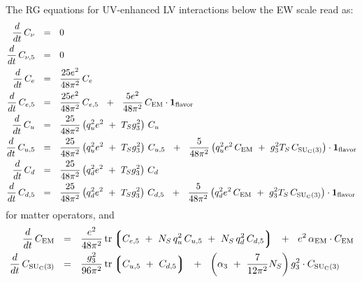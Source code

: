 \documentclass[12pt,preprintnumbers,nofootinbib]{revtex4}
\newcommand{\suc}{{{\rm SU}_{\rm C}(3)}}
\newcommand{\el}{{\rm EM}}
\newcommand{\uflavor}{\mathbf{1}_{\rm flavor}}
\newcommand{\lgr}{\left\lgroup}
\newcommand{\rgr}{\right\rgroup}
\begin{document}
%
%
	The RG equations for UV-enhanced LV interactions below the EW scale read as:
\begin{align}
\label{RG_below_ferm}
\notag
	\frac{d}{dt}\, 
	C_\nu
	&
	~~=~~
	0
	\\
\notag
	\frac{d}{dt}\, 
	C_{\nu,5}
	&
	~~=~~
	0
	\\
\notag
	\frac{d}{dt}\, 
	C_e
	&
	~~=~~
	\frac{25 e^2}{48\pi^2}\,
	C_e 
	\\
\notag
	\frac{d}{dt}\, 
	C_{e,5}
	&
	~~=~~
	\frac{25 e^2}{48\pi^2}\,
	C_{e,5}
	~~+~~
	\frac{5 e^2}{48\pi^2}\, C_\el \cdot \uflavor
	\\
	\frac{d}{dt}\, 
	C_u
	&
	~~=~~
	\frac{25}{48\pi^2}
	\left( q_u^2 e^2 ~+~ T_S g_3^2 \right)\,
	C_u
	\\
\notag
	\frac{d}{dt}\, 
	C_{u,5}
	&
	~~=~~
	\frac{25}{48\pi^2}
	\left( q_u^2 e^2 ~+~ T_S g_3^2 \right)\,
	C_{u,5}
	~~+~~
	\frac{5}{48\pi^2} \left( q_u^2 e^2\, C_\el ~+~ g_3^2 T_S\, C_\suc \right)
	\cdot \uflavor
	\\
\notag
	\frac{d}{dt}\, 
	C_d
	&
	~~=~~
	\frac{25}{48\pi^2}
	\left( q_d^2 e^2 ~+~ T_S g_3^2 \right)\,
	C_d
	\\
\notag
	\frac{d}{dt}\, 
	C_{d,5}
	&
	~~=~~
	\frac{25}{48\pi^2}
	\left( q_d^2 e^2 ~+~ T_S g_3^2 \right)\,
	C_{d,5}
	~~+~~
	\frac{5}{48\pi^2} \left( q_d^2 e^2\, C_\el ~+~ g_3^2 T_S\, C_\suc \right)
	\cdot \uflavor
\end{align}
	for matter operators, and
\begin{align}
\label{RG_below_gauge}
\notag
	\frac{d}{dt}\, 
	C_\el
	&
	~~=~~
	\frac{e^2}{48\pi^2}\,
	{\rm tr}
	\lgr
		C_{e,5} ~+~
		N_S\, q_u^2 \, C_{u,5} ~+~
		N_S\, q_d^2 \, C_{d,5}
	\rgr
	~~+~~
	e^2 \,\alpha_\el \cdot C_\el
	\\
	\frac{d}{dt}\, 
	C_\suc
	&
	~~=~~
	\frac{g_3^2}{96\pi^2}\, {\rm tr} \lgr C_{u,5} ~+~ C_{d,5} \rgr
	~~+~~
	\left(
		\alpha_3  ~+~
		\frac{7}{12\pi^2} N_S 
	\right)g_3^2 \cdot
	C_\suc
\end{align}	
\end{document}

